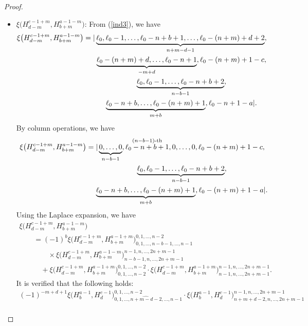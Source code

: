 \documentclass[pdftex]{sigma}
\numberwithin{equation}{section}
\begin{document}
\begin{proof}
\begin{itemize}
\item $\xi\bigl(H^{c-1+m}_{d-m}, H^{a-1-m}_{b+m}\bigr)$: From (\ref{ind3}), we have
\begin{gather*}
\xi\bigl(H^{c-1+m}_{d-m}, H^{a-1-m}_{b+m}\bigr)=|\underbrace{\ell_{0},\ell_{0}-1,\dots,\ell_0-n+b+1,\dots,\ell_{0}-(n+m)+d+2}_{n+m-d-1},\\
\hphantom{\xi\bigl(H^{c-1+m}_{d-m}, H^{a-1-m}_{b+m}\bigr)=|}{}
\underbrace{\ell_{0}-(n+m)+d,\dots,\ell_{0}-n+1}_{-m+d},\ell_{0}-(n+m)+1-c,\nonumber\\
\hphantom{\xi\bigl(H^{c-1+m}_{d-m}, H^{a-1-m}_{b+m}\bigr)=|}{}
\underbrace{\ell_{0},\ell_{0}-1,\dots,\ell_{0}-n+b+2}_{n-b-1},\nonumber\\
\hphantom{\xi\bigl(H^{c-1+m}_{d-m}, H^{a-1-m}_{b+m}\bigr)=|}{}
\underbrace{\ell_{0}-n+b,\dots,\ell_{0}-(n+m)+1}_{m+b},\ell_{0}-n+1-a|.
\end{gather*}
By column operations, we have
\begin{gather*}
\xi\bigl(H^{c-1+m}_{d-m}, H^{a-1-m}_{b+m}\bigr)=|\underbrace{0,\dots,0}_{n-b-1},\stackrel{(n-b-1)\text{-th}}{\ell_{0}-n+b+1},0, \dots,0,\ell_{0}-(n+m)+1-c,\nonumber\\
\hphantom{\xi\bigl(H^{c-1+m}_{d-m}, H^{a-1-m}_{b+m}\bigr)=|}{}
\underbrace{\ell_{0},\ell_{0}-1,\dots,\ell_{0}-n+b+2}_{n-b-1},\nonumber\\
\hphantom{\xi\bigl(H^{c-1+m}_{d-m}, H^{a-1-m}_{b+m}\bigr)=|}{}
\underbrace{\ell_{0}-n+b,\dots,\ell_{0}-(n+m)+1}_{m+b},\ell_{0}-(n+m)+1-a|\nonumber.
\end{gather*}
Using the Laplace expansion, we have
\begin{gather*}
\xi\bigl(H^{c-1+m}_{d-m}, H^{a-1-m}_{b+m}\bigr)\\
\qquad{}={(-1)}^{b}\xi\bigl(H^{c-1+m}_{d-m}, H^{a-1+m}_{b+m}\bigr)^{0,1,\dots,n-2}_{0,1,\dots,\widehat{n-b-1},\dots,n-1}\\
\qquad\qquad{}\times \xi\bigl(H^{c-1+m}_{d-m}, H^{a-1-m}_{b+m}\bigr)^{n-1,n,\dots,2n+m-1}_{n-b-1,n,\dots,2n+m-1}\\
\qquad\quad{}+\xi\bigl(H^{c-1+m}_{d-m}, H^{a-1+m}_{b+m}\bigr)^{0,1,\dots,n-2}_{0,1,\dots,n-2}\cdot\xi\bigl(H^{c-1+m}_{d-m}, H^{a-1+m}_{b+m}\bigr)^{n-1,n,\dots,2n+m-1}_{n-1,n,\dots,2n+m-1}.
\end{gather*}
It is verified that the following holds:
\begin{gather*}
{(-1)}^{-m+d+1}\xi\bigl(H^{a-1}_{b}, H^{c-1}_{d}\bigr)^{0,1,\dots,n-2}_{0,1,\dots,\widehat{n+m-d-2},\dots,n-1}\cdot\xi\bigl(H^{a-1}_{b}, H^{c-1}_{d}\bigr)^{n-1,n,\dots,2n+m-1}_{n+m+d-2,n,\dots,2n+m-1}\\

\end{gather*}
\end{itemize}
\end{proof}
\end{document}
